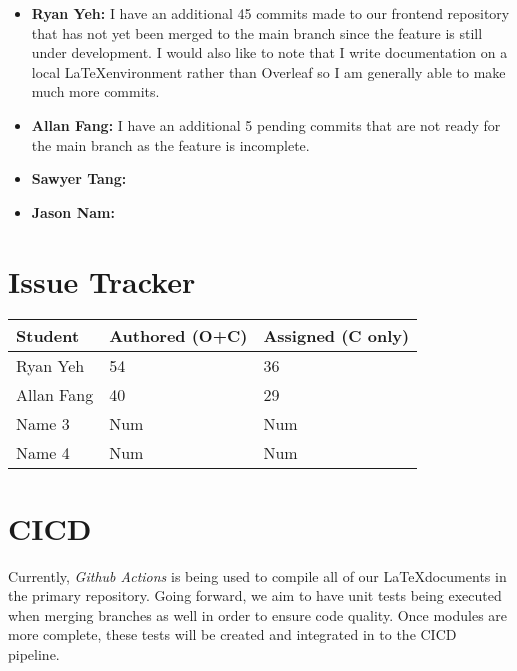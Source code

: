 \documentclass{article}
\begin{document}
\begin{itemize}
  \item \textbf{Ryan Yeh:} I have an additional 45 commits made to our frontend repository that has not yet been
  merged to the main branch since the feature is still under development. I would also like to note that I write
  documentation on a local \LaTeX environment rather than Overleaf so I am generally able to make much more commits.
  \item \textbf{Allan Fang:} I have an additional 5 pending commits that are not ready for the main branch as the feature is incomplete.
  \item \textbf{Sawyer Tang:}
  \item \textbf{Jason Nam:}
\end{itemize}

\section{Issue Tracker}


\begin{table}[H]
\centering
\begin{tabular}{lll}
\toprule
\textbf{Student} & \textbf{Authored (O+C)} & \textbf{Assigned (C only)}\\
\midrule
Ryan Yeh & 54 & 36 \\
Allan Fang & 40 & 29 \\
Name 3 & Num & Num \\
Name 4 & Num & Num \\
\bottomrule
\end{tabular}
\end{table}


\section{CICD}

Currently, \textit{Github Actions} is being used to compile all of our \LaTeX documents in the primary repository.
Going forward, we aim to have unit tests being executed when merging branches as well in order to ensure code quality.
Once modules are more complete, these tests will be created and integrated in to the CICD pipeline.
\end{document}
